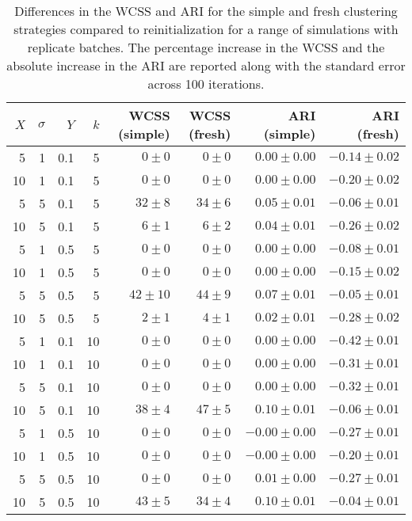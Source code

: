 \documentclass{article}
\begin{document}
\begin{table}
\caption{Differences in the WCSS and ARI for the simple and fresh clustering strategies compared to reinitialization for a range of simulations with replicate batches.
The percentage increase in the WCSS and the absolute increase in the ARI are reported along with the standard error across 100 iterations.}
\label{tab:replicate}
\begin{center}
\begin{tabular}{r r r r r r r r}
\hline
$X$ & $\sigma$ & $Y$ & $k$ & WCSS (simple) & WCSS (fresh) & ARI (simple) & ARI (fresh) \\
\hline
5 & 1 & 0.1 & 5 & $0 \pm 0$ & $0 \pm 0$ & $0.00 \pm 0.00$ & $-0.14 \pm 0.02$ \\
10 & 1 & 0.1 & 5 & $0 \pm 0$ & $0 \pm 0$ & $0.00 \pm 0.00$ & $-0.20 \pm 0.02$ \\
5 & 5 & 0.1 & 5 & $32 \pm 8$ & $34 \pm 6$ & $0.05 \pm 0.01$ & $-0.06 \pm 0.01$ \\
10 & 5 & 0.1 & 5 & $6 \pm 1$ & $6 \pm 2$ & $0.04 \pm 0.01$ & $-0.26 \pm 0.02$ \\
5 & 1 & 0.5 & 5 & $0 \pm 0$ & $0 \pm 0$ & $0.00 \pm 0.00$ & $-0.08 \pm 0.01$ \\
10 & 1 & 0.5 & 5 & $0 \pm 0$ & $0 \pm 0$ & $0.00 \pm 0.00$ & $-0.15 \pm 0.02$ \\
5 & 5 & 0.5 & 5 & $42 \pm 10$ & $44 \pm 9$ & $0.07 \pm 0.01$ & $-0.05 \pm 0.01$ \\
10 & 5 & 0.5 & 5 & $2 \pm 1$ & $4 \pm 1$ & $0.02 \pm 0.01$ & $-0.28 \pm 0.02$ \\
5 & 1 & 0.1 & 10 & $0 \pm 0$ & $0 \pm 0$ & $0.00 \pm 0.00$ & $-0.42 \pm 0.01$ \\
10 & 1 & 0.1 & 10 & $0 \pm 0$ & $0 \pm 0$ & $0.00 \pm 0.00$ & $-0.31 \pm 0.01$ \\
5 & 5 & 0.1 & 10 & $0 \pm 0$ & $0 \pm 0$ & $0.00 \pm 0.00$ & $-0.32 \pm 0.01$ \\
10 & 5 & 0.1 & 10 & $38 \pm 4$ & $47 \pm 5$ & $0.10 \pm 0.01$ & $-0.06 \pm 0.01$ \\
5 & 1 & 0.5 & 10 & $0 \pm 0$ & $0 \pm 0$ & $-0.00 \pm 0.00$ & $-0.27 \pm 0.01$ \\
10 & 1 & 0.5 & 10 & $0 \pm 0$ & $0 \pm 0$ & $-0.00 \pm 0.00$ & $-0.20 \pm 0.01$ \\
5 & 5 & 0.5 & 10 & $0 \pm 0$ & $0 \pm 0$ & $0.01 \pm 0.00$ & $-0.27 \pm 0.01$ \\
10 & 5 & 0.5 & 10 & $43 \pm 5$ & $34 \pm 4$ & $0.10 \pm 0.01$ & $-0.04 \pm 0.01$ \\
\hline
\end{tabular}
\end{center}
\end{table}
\end{document}
